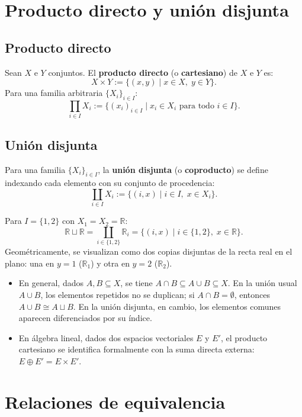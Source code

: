 \section{Producto directo y unión disjunta}

\subsection*{Producto directo}
Sean $X$ e $Y$ conjuntos. El \textbf{producto directo} (o \textbf{cartesiano}) de $X$ e $Y$ es:
$$
    X \times Y := \{(x, y) \mid x \in X, \; y \in Y\} \text{}.
$$
Para una familia arbitraria $\{X_i\}_{i \in I}$:
$$
    \prod_{i \in I} X_i := \{(x_i)_{i \in I} \mid x_i \in X_i \text{ para todo } i \in I\} \text{}.
$$

\subsection*{Unión disjunta}
Para una familia $\{X_i\}_{i \in I}$, la \textbf{unión disjunta} (o \textbf{coproducto}) se define indexando cada elemento con su conjunto de procedencia:
$$
    \coprod_{i \in I} X_i := \{(i, x) \mid i \in I, \; x \in X_i\} \text{}.
$$

\begin{ejem}
Para $I = \{1, 2\}$ con $X_1 = X_2 = \mathbb{R}$:
$$
    \mathbb{R} \sqcup \mathbb{R} = \coprod_{i \in \{1, 2\}} \mathbb{R}_i = \{(i, x) \mid i \in \{1, 2\}, \; x \in \mathbb{R}\} \text{}.
$$
Geométricamente, se visualizan como dos copias disjuntas de la recta real en el plano: una en $y = 1$ ($\mathbb{R}_1$) y otra en $y = 2$ ($\mathbb{R}_2$).
\end{ejem}

\begin{obs}
\begin{itemize}
    \item En general, dados $A, B \subseteq X$, se tiene $A \cap B \subseteq A \cup B \subseteq X$. En la unión usual $A \cup B$, los elementos repetidos no se duplican; si $A \cap B = \emptyset$, entonces $A \cup B \cong A \sqcup B$. En la unión disjunta, en cambio, los elementos comunes aparecen diferenciados por su índice.
    \item En álgebra lineal, dados dos espacios vectoriales $E$ y $E'$, el producto cartesiano se identifica formalmente con la suma directa externa: $E \oplus E' = E \times E'$.
\end{itemize}
\end{obs}

\section{Relaciones de equivalencia}

